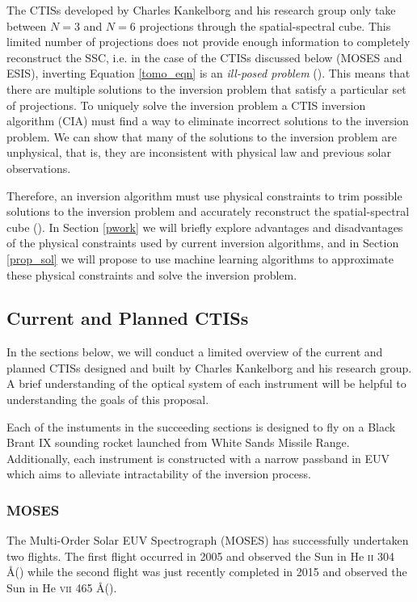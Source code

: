 \documentclass[10pt, letter]{article}
\begin{document}
			The CTISs developed by Charles Kankelborg and his research group only take between $N=3$ and $N=6$ projections through the spatial-spectral cube. This limited number of projections does not provide enough information to completely reconstruct the SSC, i.e. in the case of the CTISs discussed below (MOSES and ESIS), inverting Equation \ref{tomo_eqn} is an \textit{ill-posed problem} (\cite{inversion}). This means that there are multiple solutions to the inversion problem that satisfy a particular set of projections. To uniquely solve the inversion problem a CTIS inversion algorithm (CIA) must find a way to eliminate incorrect solutions to the inversion problem. We can show that many of the solutions to the inversion problem are unphysical, that is, they are inconsistent with physical law and previous solar observations.
			
			Therefore, an inversion algorithm must use physical constraints to trim possible solutions to the inversion problem and accurately reconstruct the spatial-spectral cube (\cite{inversion}). In Section \ref{pwork} we will briefly explore advantages and disadvantages of the physical constraints used by current inversion algorithms, and in Section \ref{prop_sol} we will propose to use machine learning algorithms to approximate these physical constraints and solve the inversion problem.
			
		\subsection{Current and Planned CTISs}

			In the sections below, we will conduct a limited overview of the current and planned CTISs designed and built by Charles Kankelborg and his research group. A brief understanding of the optical system of each instrument will be helpful to understanding the goals of this proposal. 

			Each of the instuments in the succeeding sections is designed to fly on a Black Brant IX sounding rocket launched from White Sands Missile Range. Additionally, each instrument is constructed with a narrow passband in EUV which aims to alleviate intractability of the inversion process.

			\subsubsection{MOSES} \label{moses_intro}

				The Multi-Order Solar EUV Spectrograph (MOSES) has successfully undertaken two flights. The first flight occurred in 2005 and observed the Sun in He \textsc{ii} 304 \AA (\cite{fox1}) while the second flight was just recently completed in 2015 and observed the Sun in He \textsc{vii} 465 \AA (\cite{smart1}). 			
				 		
\end{document}
